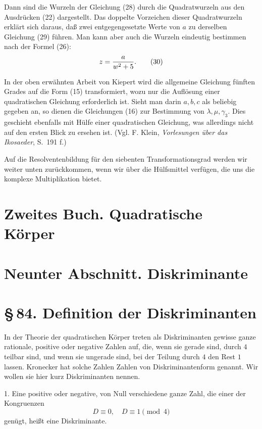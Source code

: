 \documentclass[11pt]{article}
\begin{document}
Dann sind die Wurzeln der Gleichung (28) durch die Quadratwurzeln aus den Ausdrücken (22) dargestellt. Das doppelte Vorzeichen dieser Quadratwurzeln erklärt sich daraus, daß zwei entgegengesetzte Werte von \(a\) zu derselben Gleichung (29) führen. Man kann aber auch die Wurzeln eindeutig bestimmen nach der Formel (26):
\begin{equation}
 z={a\over w^2+5}.
\tag{30}
\end{equation}

In der oben erwähnten Arbeit von Kiepert wird die allgemeine Gleichung fünften Grades auf die Form (15) transformiert, wozu nur die Auflösung einer quadratischen Gleichung erforderlich ist. Sieht man darin \(a,b,c\) als beliebig gegeben an, so dienen die Gleichungen (16) zur Bestimmung von \(\lambda,\mu,\gamma_3\). Dies geschieht ebenfalls mit Hülfe einer quadratischen Gleichung, was allerdings nicht auf den ersten Blick zu ersehen ist. (Vgl. F. Klein, \emph{Vorlesungen über das Ikosaeder}, S.~191 f.)

Auf die Resolventenbildung für den siebenten Transformationsgrad werden wir weiter unten zurückkommen, wenn wir über die Hülfsmittel verfügen, die uns die komplexe Multiplikation bietet.


\section*{Zweites Buch. Quadratische Körper}
\section*{Neunter Abschnitt. Diskriminante}
\section*{\S\,84. Definition der Diskriminanten}

In der Theorie der quadratischen Körper treten als Diskriminanten gewisse ganze rationale, positive oder negative Zahlen auf, die, wenn sie gerade sind, durch \(4\) teilbar sind, und wenn sie ungerade sind, bei der Teilung durch \(4\) den Rest \(1\) lassen.  Kronecker hat solche Zahlen Zahlen von Diskriminantenform genannt.  Wir wollen sie hier kurz Diskriminanten nennen.

1. Eine positive oder negative, von Null verschiedene ganze Zahl, die einer der Kongruenzen
\begin{equation}
        D\equiv0,\quad D\equiv1\pmod4
\tag{1}
\end{equation}
genügt, heißt eine Diskriminante.
\end{document}
